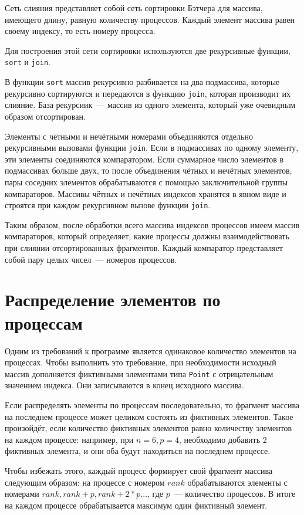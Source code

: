 \documentclass[oneside,final,14pt]{extreport}
\begin{document}
Сеть слияния представляет собой сеть сортировки Бэтчера для массива, имеющего
длину, равную количеству процессов. Каждый элемент массива равен своему индексу,
то есть номеру процесса.

Для построения этой сети сортировки используются две рекурсивные функции,
\texttt{sort} и \texttt{join}.

В функции \texttt{sort} массив рекурсивно разбивается на два подмассива,
которые рекурсивно сортируются и передаются в функцию \texttt{join}, которая
производит их слияние. База рекурсиик~--- массив из одного элемента,
который уже очевидным образом отсортирован.

Элементы с чётными и нечётными номерами объединяются отдельно рекурсивными
вызовами функции \texttt{join}. Если в подмассивах по одному элементу,
эти элементы соединяются компаратором. Если суммарное число элементов в
подмассивах больше двух, то после объединения чётных и нечётных элементов,
пары соседних элементов обрабатываются с помощью заключительной
группы компараторов. Массивы чётных и нечётных индексов хранятся в явном виде
и строятся при каждом рекурсивном вызове функции \texttt{join}.

Таким образом, после обработки всего массива индексов процессов имеем
массив компараторов, который определяет, какие процессы должны взаимодействовать
при слиянии отсортированных фрагментов. Каждый компаратор представляет собой
пару целых чисел~--- номеров процессов.

\section*{Распределение элементов по процессам}

Одним из требований к программе является одинаковое количество элементов
на процессах. Чтобы выполнить это требование, при необходимости
исходный массив дополняется фиктивными элементами типа \texttt{Point} с
отрицательным значением индекса. Они записываются в конец исходного массива.

Если распределять элементы по процессам последовательно, то фрагмент
массива на последнем процессе может целиком состоять из фиктивных элементов.
Такое произойдёт, если количество фиктивных элементов равно количеству
элементов на каждом процессе: например, при $n = 6, p = 4$, необходимо
добавить 2 фиктивных элемента, и они оба будут находиться на последнем
процессе.

Чтобы избежать этого, каждый процесс формирует свой фрагмент массива следующим
образом: на процессе с номером $rank$ обрабатываются элементы с номерами
$rank, rank + p, rank + 2*p ...$, где $p$~--- количество процессов. В итоге на
каждом процессе обрабатывается максимум один фиктивный элемент.
\end{document}
